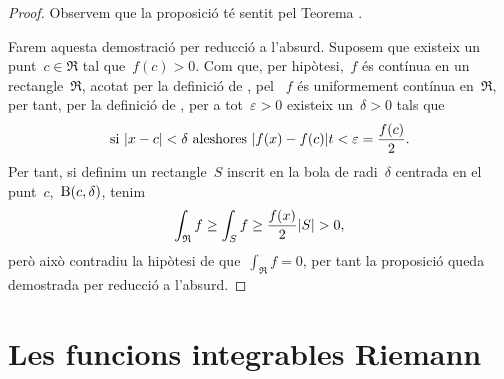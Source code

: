 \documentclass[../../main.tex]{subfiles}
\begin{document}
    \begin{proof}
        Observem que la proposició té sentit pel Teorema .

        Farem aquesta demostració per reducció a l'absurd.
        Suposem que existeix un punt~\(c\in \mathfrak{R}\) tal que~\(f(c)>0\).
        Com que, per hipòtesi,~\(f\) és contínua en un rectangle~\(\mathfrak{R}\), acotat per la definició de , pel ~\(f\) és uniformement contínua en~\(\mathfrak{R}\), per tant, per la definició de , per a tot~\(\varepsilon>0\) existeix un~\(\delta>0\) tals que
        \[
            \text{si }\abs{x-c}<\delta\text{ aleshores }\abs{f(x)-f(c)}t<\varepsilon=\frac{f(c)}{2}.
        \]
        Per tant, si definim un rectangle~\(S\) inscrit en la bola de radi~\(\delta\) centrada en el punt~\(c\),~\(\operatorname{B}(c,\delta)\), tenim %
        \[
            \int_{\mathfrak{R}}f\geq\int_{S}f\geq\frac{f(x)}{2}\abs{S}>0,
        \]
        però això contradiu la hipòtesi de que~\(\int_{\mathfrak{R}}f=0\), per tant la proposició queda demostrada per reducció a l'absurd.
    \end{proof}
\section{Les funcions integrables Riemann}
\end{document}
